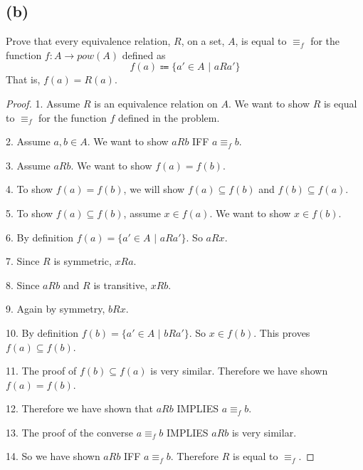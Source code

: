 \documentclass[14pt]{extarticle}
\begin{document}
\subsection{(b)}
Prove that every equivalence relation, $R$, on a set, $A$, is equal to $\equiv_f$ for the function $f: A \to pow(A)$ defined as
$$
f(a) \Coloneqq \{a' \in A \,\,|\,\, a R a'\}
$$
That is, $f(a) = R(a)$.
\begin{proof}
1. Assume $R$ is an equivalence relation on $A$. We want to show $R$ is equal to $\equiv_f$ for the function $f$ defined in the problem.

2. Assume $a, b \in A$. We want to show $a R b$ IFF $a \equiv_f b$.

3. Assume $a R b$. We want to show $f(a) = f(b)$.

4. To show $f(a) = f(b)$, we will show $f(a) \subseteq f(b)$ and $f(b) \subseteq f(a)$.

5. To show $f(a) \subseteq f(b)$, assume $x \in f(a)$. We want to show $x \in f(b)$.

6. By definition $f(a) = \{a' \in A \,\,|\,\, a R a'\}$. So $a R x$.

7. Since $R$ is symmetric, $x R a$.

8. Since $a R b$ and $R$ is transitive, $x R b$.

9. Again by symmetry, $b R x$.

10. By definition $f(b) = \{a' \in A \,\,|\,\, b R a'\}$. So $x \in f(b)$. This proves $f(a) \subseteq f(b)$.

11. The proof of $f(b) \subseteq f(a)$ is very similar. Therefore we have shown $f(a) = f(b)$.

12. Therefore we have shown that $a R b$ IMPLIES $a \equiv_f b$.

13. The proof of the converse $a \equiv_f b$ IMPLIES $a R b$ is very similar.

14. So we have shown $a R b$ IFF $a \equiv_f b$. Therefore $R$ is equal to $\equiv_f$.
\end{proof}
\end{document}
